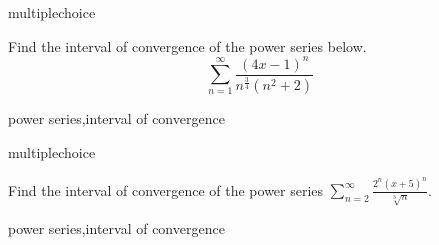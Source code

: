 \documentclass{ximera}
\begin{document}
\begin{question}[2016C.11]
\begin{type}
multiplechoice
\end{type}
Find the interval of convergence of the power series below.
\[ \sum_{n=1}^\infty \frac{(4x-1)^n}{n^\frac{3}{4} (n^2+2)} \]
\begin{multiplechoice}
\choice{\(\displaystyle \left( 0 , \frac{1}{2} \right]\)}
\choice{\(\displaystyle \left[ 0 , \frac{1}{2} \right)\)}
\choice{\(\displaystyle \left( -\frac{1}{2} , 0\right]\)}
\choice{\(\left( - \infty, \infty \right)\)}
\end{multiplechoice}
\begin{keywords}
power series,interval of convergence
\end{keywords}
\end{question}

\begin{question}[2017C.13]
\begin{type}
multiplechoice
\end{type}
Find the interval of convergence of the power series \(\displaystyle \sum_{n=2}^\infty \frac{2^n (x+5)^n}{\sqrt[3]{n}}\).
\begin{multiplechoice}
\choice[correct]{\(\displaystyle \left[ -\frac{11}{2}, -\frac{9}{2} \right)\)}
\choice{\(\displaystyle \left[ \frac{9}{2}, \frac{11}{2} \right)\)}
\end{multiplechoice}
\begin{keywords}
power series,interval of convergence
\end{keywords}
\end{question}
\end{document}
